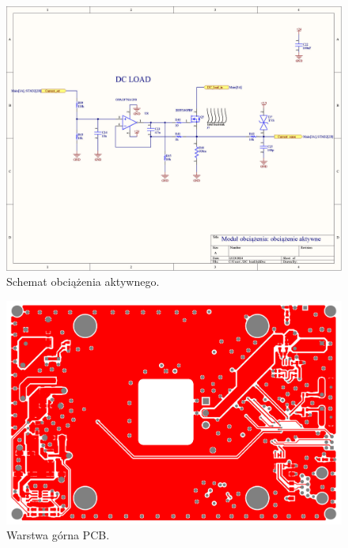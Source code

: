 \begin{figure}
    \begin{center}
        \includegraphics[width = 21cm]{zalaczniki/obciazenie/Obciążenie_aktywne_Strona_08.jpg}
        \caption{Schemat obciążenia aktywnego.}
    \end{center}
\end{figure}

\begin{figure}
    \begin{center}
        \includegraphics[width = 15cm]{zalaczniki/obciazenie/Obciążenie_aktywne_Strona_09.jpg}
        \caption{Warstwa górna PCB.}
    \end{center}
\end{figure}

